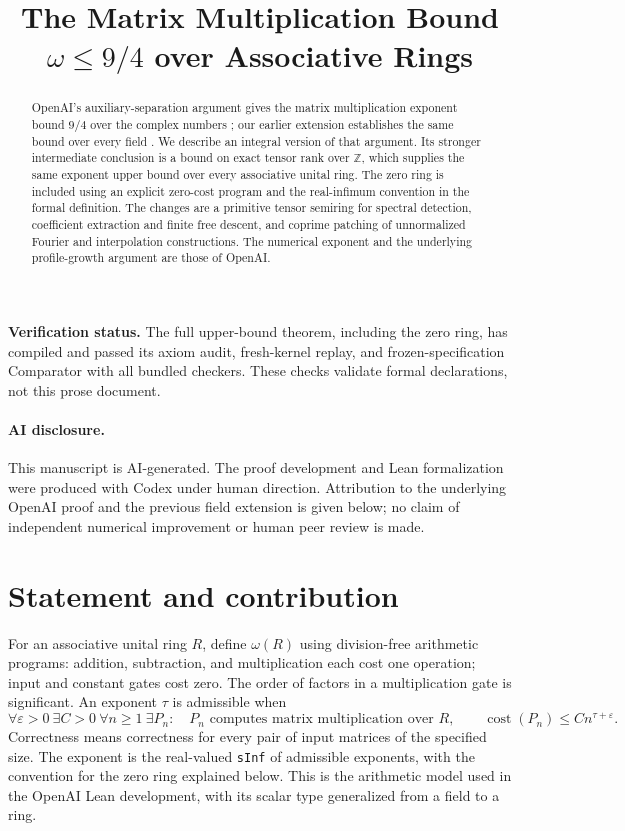 \documentclass[11pt]{article}
\title{The Matrix Multiplication Bound\\$\omega\leq9/4$ over Associative Rings}
\author{}
\date{}
\theoremstyle{remark}
\newcommand{\Z}{\mathbb Z}
\newcommand{\eps}{\varepsilon}
\numberwithin{equation}{section}
\begin{document}
\maketitle

\begin{abstract}
OpenAI's auxiliary-separation argument gives the matrix multiplication
exponent bound $9/4$ over the complex numbers \cite{OAI,OAILean}; our earlier
extension establishes the same bound over every field \cite{Fields}.
We describe an integral version of that argument. Its stronger
intermediate conclusion is a bound on exact tensor rank over $\Z$, which
supplies the same exponent upper bound over every associative unital ring.
The zero ring is included using an explicit zero-cost program and the
real-infimum convention in the formal definition.
The changes are a primitive tensor semiring for spectral detection,
coefficient extraction and finite free descent, and coprime patching of
unnormalized Fourier and interpolation constructions. The numerical
exponent and the underlying profile-growth argument are those of OpenAI.
\end{abstract}

\noindent\textbf{Verification status.} The full upper-bound theorem,
including the zero ring, has compiled and passed its axiom audit,
fresh-kernel replay, and frozen-specification Comparator with all bundled checkers.
These checks validate formal declarations, not this prose document.

\paragraph{AI disclosure.}
This manuscript is AI-generated. The proof development and Lean
formalization were produced with Codex under human direction. Attribution
to the underlying OpenAI proof and the previous field extension is given
below; no claim of independent numerical improvement or human peer review
is made.

\section{Statement and contribution}

For an associative unital ring $R$, define $\omega(R)$ using division-free
arithmetic programs: addition, subtraction, and multiplication each cost
one operation; input and constant gates cost zero. The order of factors
in a multiplication gate is significant. An exponent $\tau$ is admissible
when
\[
 \forall\eps>0\ \exists C>0\ \forall n\geq1\ \exists P_n:\quad
 P_n\text{ computes matrix multiplication over }R,\qquad
 \operatorname{cost}(P_n)\leq Cn^{\tau+\eps}.
\]
Correctness means correctness for every pair of input matrices of the
specified size. The exponent is the real-valued \texttt{sInf} of admissible
exponents, with the convention for the zero ring explained below.
This is the arithmetic model used in the OpenAI Lean development, with
its scalar type generalized from a field to a ring.
\end{document}

